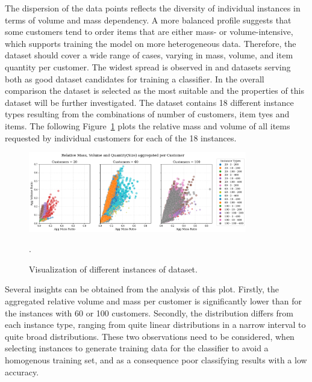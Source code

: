 The dispersion of the data points reflects the diversity of individual instances in terms of volume
and mass dependency. A more balanced profile suggests that some customers tend to order items that
are either mass- or volume-intensive, which supports training the model on more heterogeneous data.
Therefore, the dataset should cover a wide range of cases, varying in mass, volume, and item
quantity per customer. The widest spread is observed in \krebsADataSetText and \gendreauDataSetText datasets serving
both as good dataset candidates for training a classifier. In the overall comparison the \krebsADataSetText dataset
is selected as the most suitable and the properties of this dataset will be further investigated.
The dataset \krebsADataSetText contains 18 different instance types resulting from the combinations
of number of customers, item tyes and items. The following Figure~\ref{fig:krebs_dataset_analysis_detailes} plots
the relative mass and volume of all items requested by individual customers for each of the 18 instances.

\begin{figure}[ht]
    \centering
    \includegraphics[width=0.85\textwidth]{pictures/krebs_instances_detailed.png}
    \caption[Visualization of different instances of \textcite{krebs_advanced_2021} dataset.]{Visualization of different instances of \krebsADataSetText dataset.}.
    \label{fig:krebs_dataset_analysis_detailes}
\end{figure}

Several insights can be obtained from the analysis of this plot. Firstly, the aggregated relative
volume and mass per customer is significantly lower than for the instances with 60 or 100 customers. Secondly,
the distribution differs from each instance type, ranging from quite linear distributions in a narrow
interval to quite broad distributions.  These two observations need to be considered, when selecting
instances to generate training data for the classifier to avoid a homogenous training set, and
as a consequence poor classifying results with a low accuracy.




